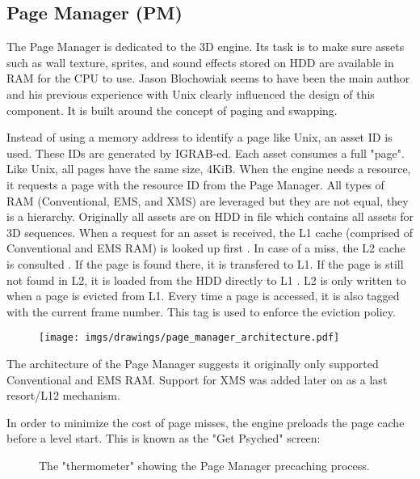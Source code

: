 \documentclass[book.tex]{subfiles}
\begin{document}
\subsection{Page Manager (PM)}
The Page Manager is dedicated to the 3D engine. Its task is to make sure assets such as wall texture, sprites, and sound effects stored on HDD are available in RAM for the CPU to use. Jason Blochowiak seems to have been the main author and his previous experience with Unix clearly influenced the design of this component. It is built around the concept of paging and swapping. \\
\par
Instead of using a memory address to identify a page like Unix, an asset ID is used. These IDs are generated by IGRAB-ed. Each asset consumes a full "page". Like Unix, all pages have the same size, 4KiB. When the engine needs a resource, it requests a page with the resource ID from the Page Manager. All types of RAM (Conventional, EMS, and XMS) are leveraged but they are not equal, they is a hierarchy. Originally all assets are on HDD in file  which contains all assets for 3D sequences. When a request for an asset is received, the L1 cache (comprised of Conventional and EMS RAM) is looked up first . In case of a miss, the L2 cache is consulted . If the page is found there, it is transfered to L1. If the page is still not found in L2, it is loaded from the HDD directly to L1 . L2 is only written to when a page is evicted from L1. Every time a page is accessed, it is also tagged with the current frame number. This tag is used to enforce the eviction policy.
 \par
\begin{figure}[H]
\centering
 \texttt{[image: imgs/drawings/page\_manager\_architecture.pdf]}
 \end{figure}
 \par
 The architecture of the Page Manager suggests it originally only supported Conventional and EMS RAM. Support for XMS was added later on as a last resort/L12 mechanism.\\
 \par
In order to minimize the cost of page misses, the engine preloads the page cache before a level start. This is known as the "Get Psyched" screen:
 \par
\begin{figure}[H]
\centering
 \caption{The "thermometer" showing the Page Manager precaching process.}
 \end{figure}
\end{document}
